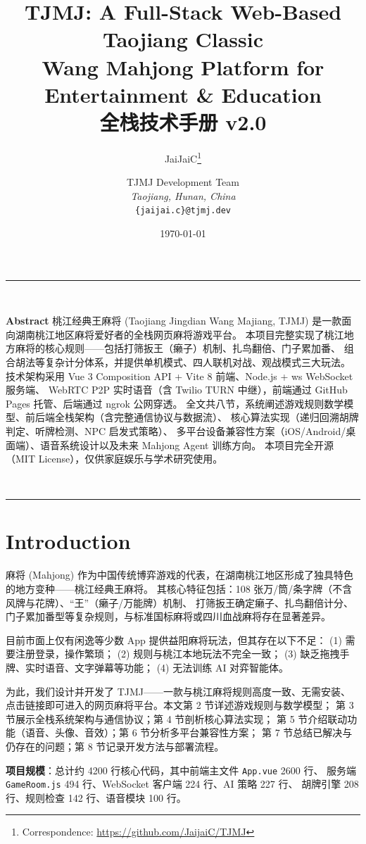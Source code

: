 \documentclass[11pt,a4paper]{article}
\title{\bfseries\LARGE TJMJ: A Full-Stack Web-Based Taojiang Classic \\[2pt]
       Wang Mahjong Platform for Entertainment \& Education \\[4pt]
       \large 全栈技术手册 v2.0}
\author{%
  JaiJaiC\thanks{Correspondence: \url{https://github.com/JaijaiC/TJMJ}}
  \and
  TJMJ Development Team \\
  \small\textit{Taojiang, Hunan, China} \\[4pt]
  \small\texttt{\{jaijai.c\}@tjmj.dev}
}
\date{\today}
\newcommand{\natureabstract}[1]{%
  \begin{center}
  \rule{\linewidth}{0.8pt}\\[2pt]
  \begin{minipage}{0.95\linewidth}
  \small\textbf{Abstract}\quad #1
  \end{minipage}\\[2pt]
  \rule{\linewidth}{0.4pt}
  \end{center}
  \vspace{4pt}
}
\begin{document}
\maketitle

\natureabstract{
  桃江经典王麻将 (Taojiang Jingdian Wang Majiang, TJMJ) 是一款面向湖南桃江地区麻将爱好者的全栈网页麻将游戏平台。
  本项目完整实现了桃江地方麻将的核心规则——包括打筛扳王（癞子）机制、扎鸟翻倍、门子累加番、
  组合胡法等复杂计分体系，并提供单机模式、四人联机对战、观战模式三大玩法。
  技术架构采用 Vue 3 Composition API + Vite 8 前端、Node.js + ws WebSocket 服务端、
  WebRTC P2P 实时语音（含 Twilio TURN 中继），前端通过 GitHub Pages 托管、后端通过 ngrok 公网穿透。
  全文共八节，系统阐述游戏规则数学模型、前后端全栈架构（含完整通信协议与数据流）、
  核心算法实现（递归回溯胡牌判定、听牌检测、NPC 启发式策略）、
  多平台设备兼容性方案（iOS/Android/桌面端）、语音系统设计以及未来 Mahjong Agent 训练方向。
  本项目完全开源（MIT License），仅供家庭娱乐与学术研究使用。
}

\tableofcontents
\newpage

\section{Introduction}

麻将 (Mahjong) 作为中国传统博弈游戏的代表，在湖南桃江地区形成了独具特色的地方变种——桃江经典王麻将。
其核心特征包括：108 张万/筒/条字牌（不含风牌与花牌）、``王''（癞子/万能牌）机制、
打筛扳王确定癞子、扎鸟翻倍计分、门子累加番型等复杂规则，与标准国标麻将或四川血战麻将存在显著差异。

目前市面上仅有闲逸等少数 App 提供益阳麻将玩法，但其存在以下不足：
(1) 需要注册登录，操作繁琐；
(2) 规则与桃江本地玩法不完全一致；
(3) 缺乏拖拽手牌、实时语音、文字弹幕等功能；
(4) 无法训练 AI 对弈智能体。

为此，我们设计并开发了 TJMJ——一款与桃江麻将规则高度一致、无需安装、
点击链接即可进入的网页麻将平台。本文第 2 节详述游戏规则与数学模型；
第 3 节展示全栈系统架构与通信协议；第 4 节剖析核心算法实现；
第 5 节介绍联动功能（语音、头像、音效）；第 6 节分析多平台兼容性方案；
第 7 节总结已解决与仍存在的问题；第 8 节记录开发方法与部署流程。

\textbf{项目规模}：总计约 4200 行核心代码，其中前端主文件 \texttt{App.vue} 2600 行、
服务端 \texttt{GameRoom.js} 494 行、WebSocket 客户端 224 行、AI 策略 227 行、
胡牌引擎 208 行、规则检查 142 行、语音模块 100 行。
\end{document}
